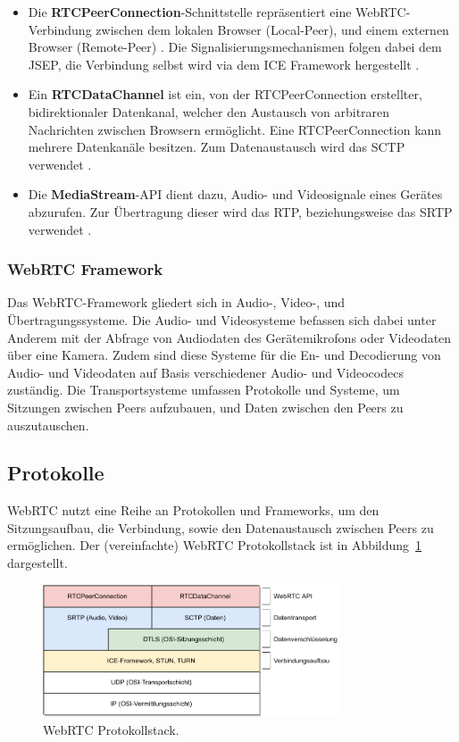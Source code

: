 \begin{itemize}
  \item Die \textbf{RTCPeerConnection}-Schnittstelle repräsentiert eine WebRTC-Verbindung zwischen dem lokalen Browser (Local-Peer), und einem externen Browser (Remote-Peer) \cite{rtcpeerconnection}. Die Signalisierungsmechanismen folgen dabei dem \ac{JSEP}, die Verbindung selbst wird via dem \ac{ICE} Framework hergestellt \cite{loreto2014, rtcpeerconnection}.
  
  \item Ein \textbf{RTCDataChannel} ist ein, von der RTCPeerConnection erstellter, bidirektionaler Datenkanal, welcher den Austausch von arbitraren Nachrichten zwischen Browsern ermöglicht. Eine RTCPeerConnection kann mehrere Datenkanäle besitzen. Zum Datenaustausch wird das \ac{SCTP} verwendet \cite{loreto2014, rtcdatachannel}.
  
  \item Die \textbf{MediaStream}-\acs{API} dient dazu, Audio- und Videosignale eines Gerätes abzurufen. Zur Übertragung dieser wird das \ac{RTP}, beziehungsweise das \ac{SRTP} verwendet \cite{loreto2014}.
\end{itemize}

\subsubsection*{WebRTC Framework}
Das \acs{WebRTC}-Framework gliedert sich in Audio-, Video-, und Übertragungssysteme. Die Audio- und Videosysteme befassen sich dabei unter Anderem mit der Abfrage von Audiodaten des Gerätemikrofons oder Videodaten über eine Kamera. Zudem sind diese Systeme für die En- und Decodierung von Audio- und Videodaten auf Basis verschiedener Audio- und Videocodecs zuständig. Die Transportsysteme umfassen Protokolle und Systeme, um Sitzungen zwischen Peers aufzubauen, und Daten zwischen den Peers zu auszutauschen.

\subsection{Protokolle}
WebRTC nutzt eine Reihe an Protokollen und Frameworks, um den Sitzungsaufbau, die Verbindung, sowie den Datenaustausch zwischen Peers zu ermöglichen. Der (vereinfachte) WebRTC Protokollstack ist in Abbildung~\ref{fig:protocols} dargestellt.

\begin{figure}[h]
\centering
\includegraphics[width=0.78\textwidth]{bilder/PDF_SVG/PROTOCOL_STACK.pdf}
\caption{\acs{WebRTC} Protokollstack.}
\label{fig:protocols}
\end{figure}

